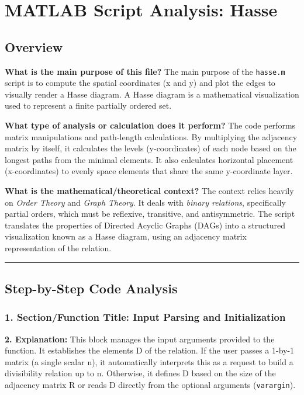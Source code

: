 \chapter{MATLAB Script Analysis: Hasse}

\section{Overview}

\textbf{What is the main purpose of this file?}
The main purpose of the \texttt{hasse.m} script is to compute the spatial coordinates (x and y) and plot the edges to visually render a Hasse diagram. A Hasse diagram is a mathematical visualization used to represent a finite partially ordered set.

\textbf{What type of analysis or calculation does it perform?}
The code performs matrix manipulations and path-length calculations. By multiplying the adjacency matrix by itself, it calculates the levels (y-coordinates) of each node based on the longest paths from the minimal elements. It also calculates horizontal placement (x-coordinates) to evenly space elements that share the same y-coordinate layer.

\textbf{What is the mathematical/theoretical context?}
The context relies heavily on \textit{Order Theory} and \textit{Graph Theory}. It deals with \textit{binary relations}, specifically partial orders, which must be reflexive, transitive, and antisymmetric. The script translates the properties of Directed Acyclic Graphs (DAGs) into a structured visualization known as a Hasse diagram, using an adjacency matrix representation of the relation.

\vspace{0.5cm}
\hrule
\vspace{0.5cm}

\section{Step-by-Step Code Analysis}

\subsection*{1. Section/Function Title: Input Parsing and Initialization}
\textbf{2. Explanation:} This block manages the input arguments provided to the function. It establishes the elements D of the relation. If the user passes a 1-by-1 matrix (a single scalar n), it automatically interprets this as a request to build a divisibility relation up to n. Otherwise, it defines D based on the size of the adjacency matrix R or reads D directly from the optional arguments (\texttt{varargin}).

